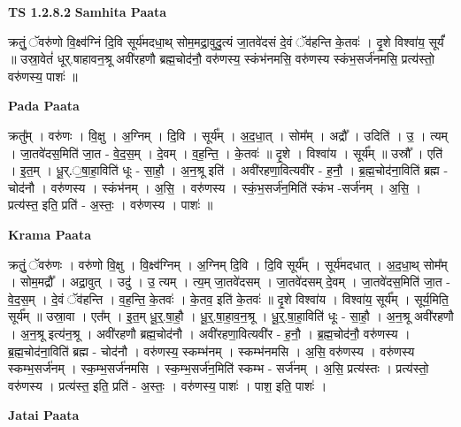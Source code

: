 \documentclass[17pt]{extarticle}
\begin{document}
\textbf{TS 1.2.8.2 } \newline
\textbf{Samhita Paata} \newline

क्रतुं॒ ॅवरु॑णो वि॒क्ष्व॑ग्निं दि॒वि सूर्य॑मदधा॒थ् सोम॒मद्रा॒वुदु॒त्यं जा॒तवे॑दसं दे॒वं ॅव॑हन्ति के॒तवः॑ । दृ॒शे विश्वा॑य॒ सूर्यं᳚ ॥ उस्रा॒वेतं॑ धूर्.षाहावन॒श्रू अवी॑रहणौ ब्रह्म॒चोद॑नौ॒ वरु॑णस्य॒ स्कंभ॑नमसि॒ वरु॑णस्य स्कंभ॒सर्ज॑नमसि॒ प्रत्य॑स्तो॒ वरु॑णस्य॒ पाशः॑ ॥ \newline

\textbf{Pada Paata} \newline

क्रतु᳚म् । वरु॑णः । वि॒क्षु । अ॒ग्निम् । दि॒वि । सूर्य᳚म् । अ॒द॒धा॒त् । सोम᳚म् । अद्रौ᳚ । उदिति॑ । उ॒ । त्यम् । जा॒तवे॑दस॒मिति॑ जा॒त - वे॒द॒स॒म् । दे॒वम् । व॒ह॒न्ति॒ । के॒तवः॑ ॥ दृ॒शे । विश्वा॑य । सूर्य᳚म् ॥ उस्रौ᳚ । एति॑ । इ॒त॒म् । धू॒र्.॒षा॒हा॒विति॑ धूः - सा॒हौ॒ । अ॒न॒श्रू इति॑ । अवी॑रहणा॒वित्यवी॑र - ह॒नौ॒ । ब्र॒ह्म॒चोद॑ना॒विति॑ ब्रह्म - चोद॑नौ । वरु॑णस्य । स्कंभ॑नम् । अ॒सि॒ । वरु॑णस्य । स्कं॒भ॒सर्ज॑न॒मिति॑ स्कंभ -सर्ज॑नम् । अ॒सि॒ । प्रत्य॑स्त॒ इति॒ प्रति॑ - अ॒स्तः॒ । वरु॑णस्य । पाशः॑ ॥  \newline


\textbf{Krama Paata} \newline

क्रतुं॒ ॅवरु॑णः । वरु॑णो वि॒क्षु । वि॒क्ष्व॑ग्निम् । अ॒ग्निम् दि॒वि । दि॒वि सूर्य᳚म् । सूर्य॑मदधात् । अ॒द॒धा॒थ् सोम᳚म् । सोम॒मद्रौ᳚ । अद्रा॒वुत् । उदु॑ । उ॒ त्यम् । त्य॒म् जा॒तवे॑दसम् । जा॒तवे॑दसम् दे॒वम् । जा॒तवे॑दस॒मिति॑ जा॒त - वे॒द॒स॒म् । दे॒वं ॅव॑हन्ति । व॒ह॒न्ति॒ के॒तवः॑ । के॒तव॒ इति॑ के॒तवः॑ ॥ दृ॒शे विश्वा॑य । विश्वा॑य॒ सूर्य᳚म् । सूर्य॒मिति॒ सूर्य᳚म् ॥ उस्रा॒वा । एत᳚म् । इ॒त॒म् धू॒र्॒.षा॒हौ॒ । धू॒र्॒.षा॒हा॒व॒न॒श्रू । धू॒र्॒.षा॒हा॒विति॑ धूः - सा॒हौ॒ । अ॒न॒श्रू अवी॑रहणौ । अ॒न॒श्रू इत्य॑न॒श्रू । अवी॑रहणौ ब्रह्म॒चोद॑नौ । अवी॑रहणा॒वित्यवी॑र - ह॒नौ॒ । ब्र॒ह्म॒चोद॑नौ॒ वरु॑णस्य । ब्र॒ह्म॒चोद॑ना॒विति॑ ब्रह्म - चोद॑नौ । वरु॑णस्य॒ स्कम्भ॑नम् । स्कम्भ॑नमसि । अ॒सि॒ वरु॑णस्य । वरु॑णस्य स्कम्भ॒सर्ज॑नम् । स्क॒म्भ॒सर्ज॑नमसि । स्क॒म्भ॒सर्ज॑न॒मिति॑ स्कम्भ - सर्ज॑नम् । अ॒सि॒ प्रत्य॑स्तः । प्रत्य॑स्तो॒ वरु॑णस्य । प्रत्य॑स्त॒ इति॒ प्रति॑ - अ॒स्तः॒ । वरु॑णस्य॒ पाशः॑ । पाश॒ इति॒ पाशः॑ । \newline

\textbf{Jatai Paata} \newline
\end{document}
